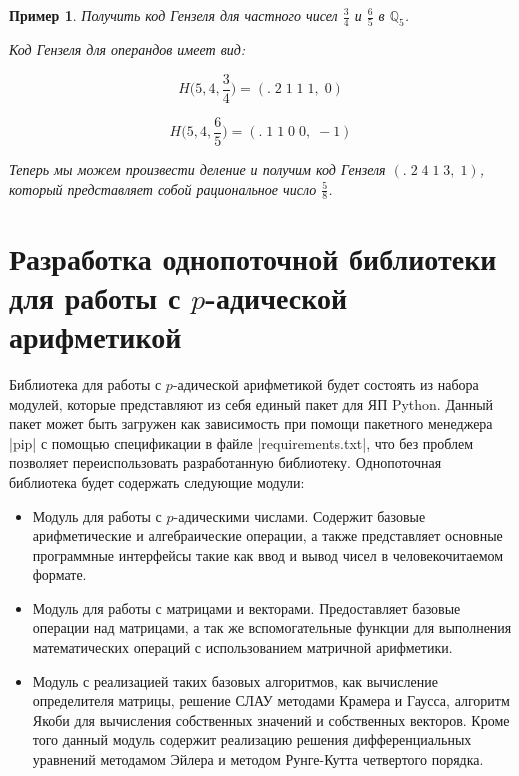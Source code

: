 \documentclass[master, och, diploma, times]{sty/SCWorks}
\theoremstyle{plain}
\newtheorem{exmp}{Пример}[section]
\theoremstyle{definition}
\numberwithin{equation}{section}
\begin{document}
\begin{exmp}
Получить код Гензеля для частного чисел $\frac{3}{4}$ и $\frac{6}{5}$ в $\mathbb{Q}_5$.

\noindent Код Гензеля для операндов имеет вид:

$$H\bigg(5,4, \frac{3}{4}\bigg)=(.\; 2\; 1\; 1\; 1,\; 0)$$

$$H\bigg(5,4, \frac{6}{5}\bigg)=(.\; 1\; 1\; 0\; 0,\; -1)$$

\noindent Теперь мы можем произвести деление и получим код Гензеля $(.\; 2\; 4\; 1\; 3,\; 1)$, который представляет собой рациональное число $\frac{5}{8}$.
\end{exmp}

\section{Разработка однопоточной библиотеки для работы с $p$-адической арифметикой}

Библиотека для работы с $p$-адической арифметикой будет состоять из набора модулей, которые представляют из себя единый пакет для ЯП Python. Данный пакет может быть загружен как зависимость при помощи пакетного менеджера |pip| с помощью спецификации в файле |requirements.txt|, что без проблем позволяет переиспользовать разработанную библиотеку. Однопоточная библиотека будет содержать следующие модули:

\begin{itemize}
\item Модуль для работы с $p$-адическими числами. Содержит базовые арифметические и алгебраические операции, а также представляет основные программные интерфейсы такие как ввод и вывод чисел в человекочитаемом формате.
\item Модуль для работы с матрицами и векторами. Предоставляет базовые операции над матрицами, а так же вспомогательные функции для выполнения математических операций с использованием матричной арифметики.
\item Модуль с реализацией таких базовых алгоритмов, как вычисление определителя матрицы, решение СЛАУ методами Крамера и Гаусса, алгоритм Якоби для вычисления собственных значений и собственных векторов. Кроме того данный модуль содержит реализацию решения дифференциальных уравнений методамом Эйлера и методом Рунге-Кутта четвертого порядка.
\end{itemize}
\end{document}
